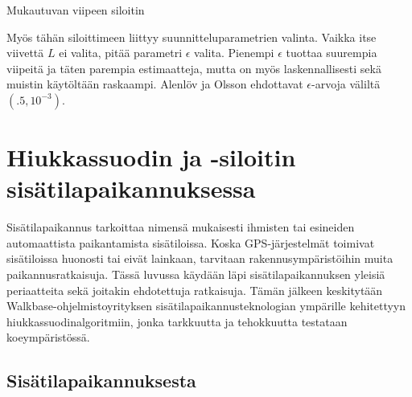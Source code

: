 \documentclass[
  12pt,
  a4paper, twoside]{book}
\begin{document}
\begin{algorithm}[H]
\label{mukautuva-siloitin}
\DontPrintSemicolon
\SetAlgoShortEnd
{}
\caption{Mukautuvan viipeen siloitin}
\end{algorithm}

Myös tähän siloittimeen liittyy suunnitteluparametrien valinta. Vaikka itse viivettä \(L\) ei valita, pitää parametri \(\epsilon\) valita. Pienempi \(\epsilon\) tuottaa suurempia viipeitä ja täten parempia estimaatteja, mutta on myös laskennallisesti sekä muistin käytöltään raskaampi. Alenlöv ja Olsson ehdottavat \(\epsilon\)-arvoja väliltä \((.5, 10^{-3})\).

\chapter{Hiukkassuodin ja -siloitin sisätilapaikannuksessa} \label{paikannusesimerkki}

Sisätilapaikannus tarkoittaa nimensä mukaisesti ihmisten tai esineiden automaattista paikantamista sisätiloissa. Koska GPS-järjestelmät toimivat sisätiloissa huonosti tai eivät lainkaan, tarvitaan rakennusympäristöihin muita paikannusratkaisuja. Tässä luvussa käydään läpi sisätilapaikannuksen yleisiä periaatteita sekä joitakin ehdotettuja ratkaisuja. Tämän jälkeen keskitytään Walkbase-ohjelmistoyrityksen sisätilapaikannusteknologian ympärille kehitettyyn hiukkassuodinalgoritmiin, jonka tarkkuutta ja tehokkuutta testataan koeympäristössä.

\section{Sisätilapaikannuksesta}
\end{document}
